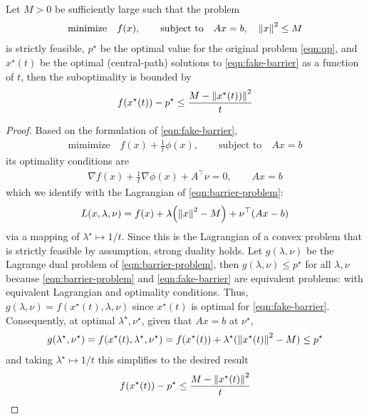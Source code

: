 \documentclass[12pt]{article}
\begin{document}
\begin{theorem}
  Let \(M > 0\) be sufficiently large such that
  the problem
  \begin{align}
    \text{minimize} \quad f(x),
      \qquad \text{subject to} \quad Ax = b, \quad {\left\lVert x\right\rVert}^2 \leq M
      \label{eqn:barrier-problem}
  \end{align}
  is strictly feasible,
  \(p^\star\) be the optimal value for the
  original problem \eqref{eqn:qp},
  and \(x^\star (t)\) be the optimal (central-path) solutions to
  \eqref{eqn:fake-barrier} as a function of \(t\),
  then the suboptimality is bounded by
  \begin{align*}
    f(x^\star (t)) - p^\star
      \leq \frac{M - {\left\lVert x^\star (t))\right\rVert}^2}{t}
  \end{align*}
\end{theorem}
\begin{proof}
  Based on the formulation of \eqref{eqn:fake-barrier},
  \begin{align*}
    \text{mimimize} \quad f(x) + \frac{1}{t} \phi(x),
      \qquad \text{subject to} \quad Ax = b
  \end{align*}
  its optimality conditions are
  \begin{align*}
    \nabla f(x) + \frac{1}{t} \nabla \phi(x) + A^\top \nu = 0,
      \qquad
      Ax = b
  \end{align*}
  which we identify with the Lagrangian of \eqref{eqn:barrier-problem}:
  \begin{align*}
    L(x, \lambda, \nu)
      = f(x) + \lambda {\left({\left\lVert x\right\rVert}^2 - M\right)} + \nu^\top (Ax - b)
  \end{align*}
  via a mapping of \(\lambda^\star \mapsto 1/t\).
  Since this is the Lagrangian of a convex problem that is
  strictly feasible by assumption, strong duality holds.
  Let \(g(\lambda, \nu)\) be the Lagrange dual problem
  of \eqref{eqn:barrier-problem},
  then \(g(\lambda, \nu) \leq p^\star\)
  for all \(\lambda, \nu\) because
  \eqref{eqn:barrier-problem} and
  \eqref{eqn:fake-barrier} are equivalent problems:
  with equivalent Lagrangian and optimality conditions.
  Thus, \(g(\lambda, \nu) = f(x^\star (t), \lambda, \nu)\)
  since \(x^\star (t)\) is optimal for \eqref{eqn:fake-barrier}.
  Consequently, at optimal
  \(\lambda^\star, \nu^\star\),
  given that \(Ax = b\) at \(\nu^\star\),
  \begin{align*}
    g(\lambda^\star, \nu^\star)
      = f(x^\star (t), \lambda^\star, \nu^\star)
      = f(x^\star(t)) + \lambda^\star ({\left\lVert x^\star (t)\right\rVert}^2 - M)
      \leq p^\star
  \end{align*}
  and taking \(\lambda^\star \mapsto 1 / t\)
  this simplifies to the desired result
  \begin{align*}
    f(x^\star (t)) - p^\star
      \leq \frac{M - {\left\lVert x^\star (t)\right\rVert}^2}{t}
  \end{align*}

\end{proof}
\end{document}
